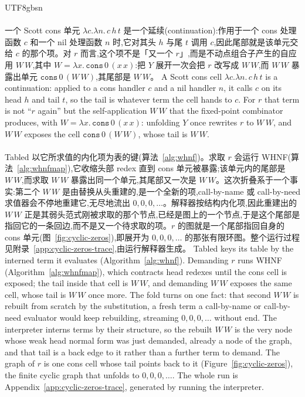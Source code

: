 \begin{CJK*}{UTF8}{gbsn}
  \paragraph{}
  \ifPaperChinese
  一个 Scott cons 单元 $\lambda c.\lambda n.\,c\,h\,t$ 是一个延续(continuation):作用于一个 cons 处理函数 $c$ 和一个 nil 处理函数 $n$ 时,它对其头 $h$ 与尾 $t$ 调用 $c$,因此尾部就是该单元交给 $c$ 的那个项。对 $r$ 而言,这个项不是「又一个 $r$」,而是不动点组合子产生的自应用 $W\,W$,其中 $W = \lambda x.\,\mathtt{cons}\,0\,(x\,x)$:把 $Y$ 展开一次会把 $r$ 改写成 $W\,W$,而 $W\,W$ 暴露出单元 $\mathtt{cons}\,0\,(W\,W)$,其尾部是 $W\,W$。
  \else
  A Scott cons cell $\lambda c.\lambda n.\,c\,h\,t$ is a continuation: applied to a cons handler $c$ and a nil handler $n$, it calls $c$ on its head $h$ and tail $t$, so the tail is whatever term the cell hands to $c$. For $r$ that term is not ``$r$ again'' but the self-application $W\,W$ that the fixed-point combinator produces, with $W = \lambda x.\,\mathtt{cons}\,0\,(x\,x)$: unfolding $Y$ once rewrites $r$ to $W\,W$, and $W\,W$ exposes the cell $\mathtt{cons}\,0\,(W\,W)$, whose tail is $W\,W$.
  \fi

  \paragraph{}
  \ifPaperChinese
  \textsf{Tabled} 以它所求值的内化项为表的键(算法~\ref{alg:whnf})。求取 $r$ 会运行 \textsf{WHNF}(算法~\ref{alg:whnfmap}),它收缩头部 redex 直到 cons 单元被暴露;该单元内的尾部是 $W\,W$,而求取 $W\,W$ 暴露出同一个单元,其尾部又一次是 $W\,W$。这次折叠系于一个事实:第二个 $W\,W$ 是由替换从头重建的,是一个全新的项,call-by-name 或 call-by-need 求值器会不停地重建它,无尽地流出 $0,0,0,\dots$。解释器按结构内化项,因此重建出的 $W\,W$ 正是其弱头范式刚被求取的那个节点,已经是图上的一个节点,于是这个尾部是指回它的一条回边,而不是又一个待求取的项。$r$ 的图就是一个尾部指回自身的 cons 单元(图~\ref{fig:cyclic-zeros}),即展开为 $0,0,0,\dots$ 的那张有限环图。整个运行过程见附录~\ref{app:cyclic-zeros-trace},由运行解释器生成。
  \else
  \textsf{Tabled} keys its table by the interned term it evaluates (Algorithm~\ref{alg:whnf}). Demanding $r$ runs \textsf{WHNF} (Algorithm~\ref{alg:whnfmap}), which contracts head redexes until the cons cell is exposed; the tail inside that cell is $W\,W$, and demanding $W\,W$ exposes the same cell, whose tail is $W\,W$ once more. The fold turns on one fact: that second $W\,W$ is rebuilt from scratch by the substitution, a fresh term a call-by-name or call-by-need evaluator would keep rebuilding, streaming $0,0,0,\dots$ without end. The interpreter interns terms by their structure, so the rebuilt $W\,W$ is the very node whose weak head normal form was just demanded, already a node of the graph, and that tail is a back edge to it rather than a further term to demand. The graph of $r$ is one cons cell whose tail points back to it (Figure~\ref{fig:cyclic-zeros}), the finite cyclic graph that unfolds to $0,0,0,\dots$. The whole run is Appendix~\ref{app:cyclic-zeros-trace}, generated by running the interpreter.
  \fi


\end{CJK*}
